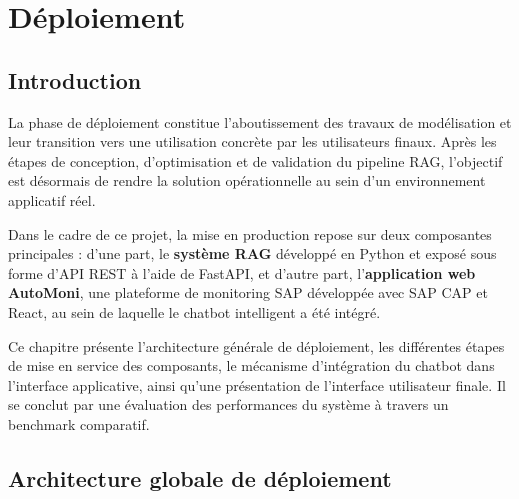 

\chapter{Déploiement}
\section*{Introduction}
La phase de déploiement constitue l’aboutissement des travaux de modélisation et leur transition vers une utilisation concrète par les utilisateurs finaux. Après les étapes de conception, d’optimisation et de validation du pipeline RAG, l’objectif est désormais de rendre la solution opérationnelle au sein d’un environnement applicatif réel.

Dans le cadre de ce projet, la mise en production repose sur deux composantes principales : d’une part, le \textbf{système RAG} développé en Python et exposé sous forme d’API REST à l’aide de FastAPI, et d’autre part, l’\textbf{application web AutoMoni}, une plateforme de monitoring SAP développée avec SAP CAP et React, au sein de laquelle le chatbot intelligent a été intégré.

Ce chapitre présente l’architecture générale de déploiement, les différentes étapes de mise en service des composants, le mécanisme d’intégration du chatbot dans l’interface applicative, ainsi qu’une présentation de l’interface utilisateur finale. Il se conclut par une évaluation des performances du système à travers un benchmark comparatif.
\section{Architecture globale de déploiement}

